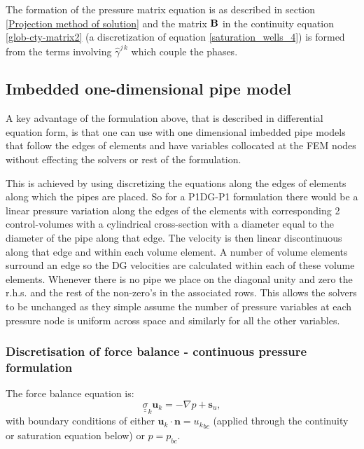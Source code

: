 The formation of the pressure matrix equation is as described in section \ref{Projection method of solution} and the matrix ${\bf B}$ in the continuity equation \ref{glob-cty-matrix2} (a discretization of equation \ref{saturation_wells_4}) is formed from the terms involving $\hat\gamma^{j\, k}$ which couple the phases.




\subsection{Imbedded one-dimensional pipe model}
\label{1d-well-dicsretization}
A key advantage of the formulation above, that is described in differential equation
form, is that one can use with one dimensional imbedded pipe models that
follow the edges of elements and have variables collocated at the FEM nodes without
effecting the solvers or rest of the formulation.

This is achieved by using discretizing the equations along the edges of elements along which the
pipes are placed. So for a P1DG-P1 formulation there would be a linear pressure variation
along the edges of the elements with corresponding 2 control-volumes with a cylindrical
cross-section with a diameter equal to the diameter of the pipe along that edge. The velocity
is then linear discontinuous along that edge and within each volume element.
A number of volume elements surround an edge so the DG velocities are calculated within
each of these volume elements. Whenever there is no pipe we place on the diagonal unity and
zero the r.h.s. and the rest of the non-zero's in the associated rows.
This allows the solvers to be unchanged as they simple assume the number of pressure variables
at each pressure node is uniform across space and similarly for all the other variables.





\subsubsection{Discretisation of force balance - continuous pressure formulation}



The force balance equation is:
\begin{equation}
{\underline {\underline \sigma}}_k {\mathbf u}_k = - \nabla p + {\mathbf s}_u,
\label{pipe-force-bal}
\end{equation}
with boundary conditions of either
${{\mathbf u}_k}\cdot {\mathbf n} = {{ u}_k}_{bc}$ (applied through the continuity
or saturation
equation below) or $p = p_{bc}$.

